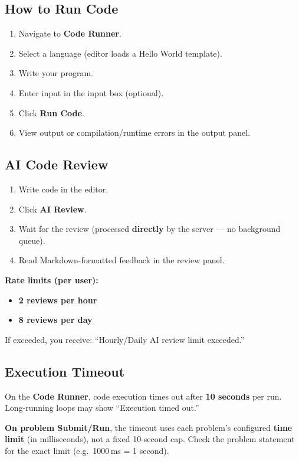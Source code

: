 \documentclass[11pt,a4paper]{article}
\begin{document}
\subsection{How to Run Code}
\begin{enumerate}
  \item Navigate to \textbf{Code Runner}.
  \item Select a language (editor loads a Hello World template).
  \item Write your program.
  \item Enter input in the input box (optional).
  \item Click \textbf{Run Code}.
  \item View output or compilation/runtime errors in the output panel.
\end{enumerate}

\subsection{AI Code Review}
\begin{enumerate}
  \item Write code in the editor.
  \item Click \textbf{AI Review}.
  \item Wait for the review (processed \textbf{directly} by the server --- no background queue).
  \item Read Markdown-formatted feedback in the review panel.
\end{enumerate}

\textbf{Rate limits (per user):}
\begin{itemize}[noitemsep]
  \item \textbf{2 reviews per hour}
  \item \textbf{8 reviews per day}
\end{itemize}

If exceeded, you receive: ``Hourly/Daily AI review limit exceeded.''

\subsection{Execution Timeout}
On the \textbf{Code Runner}, code execution times out after \textbf{10 seconds} per run. Long-running loops may show ``Execution timed out.''

\textbf{On problem Submit/Run}, the timeout uses each problem's configured \textbf{time limit} (in milliseconds), not a fixed 10-second cap. Check the problem statement for the exact limit (e.g.\ 1000\,ms = 1 second).
\end{document}
